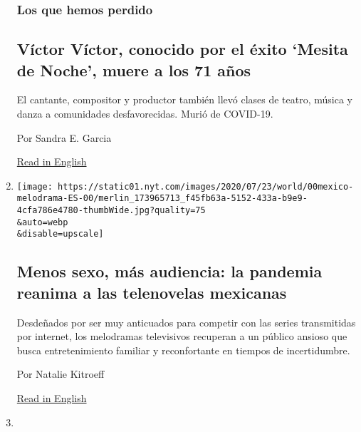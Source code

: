 \begin{enumerate}
  \hypertarget{los-que-hemos-perdido}{%
  \subsubsection{Los que hemos perdido}\label{los-que-hemos-perdido}}

  \hypertarget{vuxedctor-vuxedctor-conocido-por-el-uxe9xito-mesita-de-noche-muere-a-los-71-auxf1os}{%
  \subsection{Víctor Víctor, conocido por el éxito `Mesita de Noche',
  muere a los 71
  años}\label{vuxedctor-vuxedctor-conocido-por-el-uxe9xito-mesita-de-noche-muere-a-los-71-auxf1os}}

  El cantante, compositor y productor también llevó clases de teatro,
  música y danza a comunidades desfavorecidas. Murió de COVID-19.

  Por Sandra E. Garcia

  \href{https://www.nytimes.com/2020/08/01/obituaries/victor-victor-dead-coronavirus.html}{Read
  in English}
\item
  \href{/es/2020/08/02/espanol/america-latina/televisa-rosa-de-guadalupe-netflix.html}{}

  \texttt{[image: https://static01.nyt.com/images/2020/07/23/world/00mexico-melodrama-ES-00/merlin\_173965713\_f45fb63a-5152-433a-b9e9-4cfa786e4780-thumbWide.jpg?quality=75\\\&auto=webp\\\&disable=upscale]}

  \hypertarget{menos-sexo-muxe1s-audiencia-la-pandemia-reanima-a-las-telenovelas-mexicanas}{%
  \subsection{Menos sexo, más audiencia: la pandemia reanima a las
  telenovelas
  mexicanas}\label{menos-sexo-muxe1s-audiencia-la-pandemia-reanima-a-las-telenovelas-mexicanas}}

  Desdeñados por ser muy anticuados para competir con las series
  transmitidas por internet, los melodramas televisivos recuperan a un
  público ansioso que busca entretenimiento familiar y reconfortante en
  tiempos de incertidumbre.

  Por Natalie Kitroeff

  \href{https://www.nytimes.com/2020/08/02/world/americas/mexico-tv-virus-telenovela.html}{Read
  in English}
\item
  \href{/es/2020/08/02/espanol/estilos-de-vida/adopcion-orfanato.html}{}


\end{enumerate}
